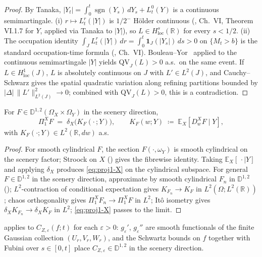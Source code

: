 \documentclass[EJP]{ejpecp}
\newcommand{\R}{\mathbb{R}}
\renewcommand{\E}{\mathbb{E}}
\newcommand{\IBM}{Z}
\newcommand{\Pir}{\Pi}
\DeclareMathOperator{\sgn}{sgn}
\begin{document}
\begin{proof}
By Tanaka, $|Y_t|=\int_0^{t}\sgn(Y_s)\,dY_s+L_t^{0}(Y)$ is a
continuous semimartingale.
(i) $r\mapsto L_t^{r}(|Y|)$ is $1/2^{-}$ H\"older continuous
(\cite{RevuzYor}, Ch.~VI, Theorem VI.1.7 for $Y$, applied via
Tanaka to $|Y|$), so $L\in H^{s}_{\mathrm{loc}}(\R)$ for every
$s<1/2$.
(ii) The occupation identity
$\int_J L_t^{r}(|Y|)\,dr=\int_0^{t}\mathbf 1_J(|Y_s|)\,ds>0$ on
$\{M_t>b\}$ is the standard occupation-time formula
(\cite{RevuzYor}, Ch.~VI). Bouleau--Yor~\cite{BouleauYor} applied to
the continuous semimartingale $|Y|$ yields $\mathrm{QV}_J(L)>0$ a.s.\
on the same event. If $L\in H^{1}_{\mathrm{loc}}(J)$, $L$ is
absolutely continuous on $J$ with $L'\in L^{2}(J)$, and
Cauchy--Schwarz gives the spatial quadratic variation along
refining partitions bounded by $|\Delta|\,\|L'\|_{L^{2}(J)}^{2}\to 0$;
combined with $\mathrm{QV}_J(L)>0$, this is a contradiction.
\end{proof}

\begin{lemma}
\label{lem:proj1-X}
For $F\in\mathbb D^{1,2}(\Omega_X\times\Omega_Y)$ in the scenery
direction,
\begin{equation}\label{eq:proj1-X}
  \Pir_1^{X}F
   \;=\;\delta_X\bigl(K_F(\cdot\,;Y)\bigr),
  \qquad
  K_F(w;Y)\;\coloneqq\;\E_X[D_w^{X}F\mid Y],
\end{equation}
with $K_F(\cdot;Y)\in L^{2}(\R,dw)$ a.s.
\end{lemma}

\begin{proof}
For smooth cylindrical $F$, the section $F(\cdot,\omega_Y)$ is
smooth cylindrical on the scenery factor; Stroock on $X$
(\cite[Prop.~1.3.1]{Nualart}) gives the fibrewise identity. Taking
$\E_X[\,\cdot\mid Y]$ and applying $\delta_X$ produces
\eqref{eq:proj1-X} on the cylindrical subspace. For general
$F\in\mathbb D^{1,2}$ in the scenery direction, approximate by smooth
cylindrical $F_n$ in $\mathbb D^{1,2}$
(\cite[\S1.2]{Nualart}); $L^{2}$-contraction of conditional
expectation gives $K_{F_n}\to K_F$ in $L^{2}(\Omega;L^{2}(\R))$;
chaos orthogonality gives $\Pir_1^X F_n\to\Pir_1^X F$ in $L^{2}$;
It\^o isometry gives $\delta_X K_{F_n}\to\delta_X K_F$ in $L^{2}$;
\eqref{eq:proj1-X} passes to the limit.
\end{proof}

 applies to $C_{\IBM,\varepsilon}(f;t)$ for each
$\varepsilon>0$: $g_\varepsilon'$, $g_\varepsilon''$ are smooth
functionals of the finite Gaussian collection $(U_r,V_r,W_r)$, and
the Schwartz bounds on $f$ together with Fubini over $s\in[0,t]$
place $C_{\IBM,\varepsilon}\in\mathbb D^{1,2}$ in the scenery
direction.
\end{document}
